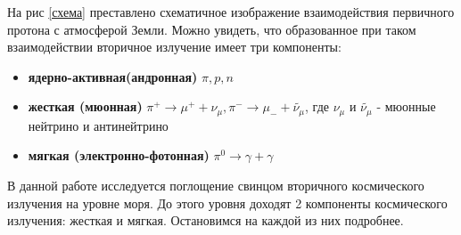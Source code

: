 \documentclass[a4paper,12pt]{article} %
\begin{document}
На рис \ref{схема} преставлено схематичное изображение взаимодействия первичного протона с атмосферой Земли. Можно увидеть, что образованное при таком взаимодействии вторичное излучение имеет три компоненты:
\begin{itemize}
    \item \textbf{ядерно-активная(андронная)}  $\pi, p, n$
    \item \textbf{жесткая (мюонная)}  $\pi^{+} \rightarrow \mu^{+} + \nu_{\mu}, \pi^- \rightarrow \mu_- +  \widetilde{\nu_{\mu}}$, где $\nu_\mu$ и $\widetilde{\nu_{\mu}}$ - мюонные нейтрино и антинейтрино
    \item \textbf{мягкая (электронно-фотонная)} $\pi^0 \rightarrow \gamma + \gamma$
\end{itemize}
В данной работе исследуется поглощение свинцом вторичного космического излучения на уровне моря. До этого уровня доходят 2 компоненты космического излучения: жесткая и мягкая. Остановимся на каждой из них подробнее.
\end{document}
